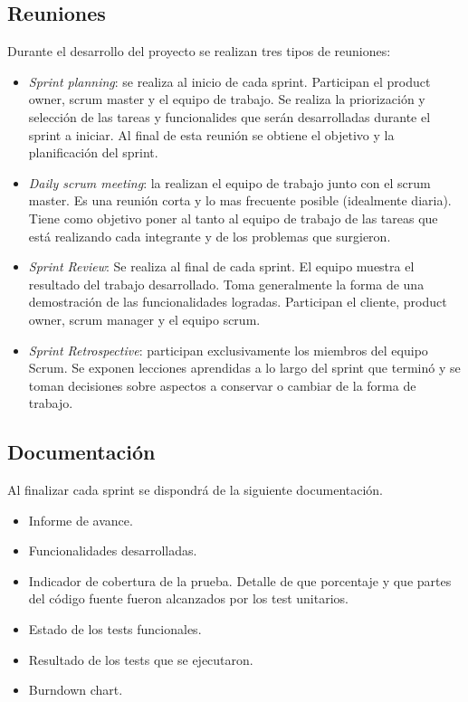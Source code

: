 \documentclass[12pt,a4paper]{article}
\begin{document}
	\subsection{Reuniones}
	Durante el desarrollo del proyecto se realizan tres tipos de reuniones:

	\begin{itemize}
	\item \textit{Sprint planning}: se realiza al inicio de cada sprint. Participan el product owner, scrum master y el equipo de trabajo. Se realiza la priorización y selección de las tareas y funcionalides que serán desarrolladas durante el sprint a iniciar. Al final de esta reunión se obtiene el objetivo y la planificación del sprint.

	\item \textit{Daily scrum meeting}: la realizan el equipo de trabajo junto con el scrum master. Es una reunión corta y lo mas frecuente posible (idealmente diaria).  Tiene como objetivo poner al tanto al equipo de trabajo de las tareas que está realizando cada integrante y de los problemas que surgieron.

	\item \textit{Sprint Review}: Se realiza al final de cada sprint. El equipo muestra el resultado del trabajo desarrollado. Toma generalmente la forma de una demostración de las funcionalidades logradas. Participan el cliente, product owner, scrum manager y el equipo scrum.

	\item \textit{Sprint Retrospective}: participan exclusivamente los miembros del equipo Scrum. Se exponen lecciones aprendidas a lo largo del sprint que terminó y se toman decisiones sobre aspectos a conservar o cambiar de la forma de trabajo.
	\end{itemize}


	\subsection{Documentación}
	Al finalizar cada sprint se dispondrá de la siguiente documentación.

	\begin{itemize}
		\item Informe de avance.
		\item Funcionalidades desarrolladas.
		\item Indicador de cobertura de la prueba. Detalle de que porcentaje y que partes del código fuente fueron alcanzados por los test unitarios.
		\item Estado de los tests funcionales.
		\item Resultado de los tests que se ejecutaron.
		\item Burndown chart.
	\end{itemize}
\end{document}
